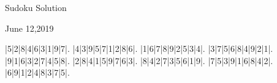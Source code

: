 \documentclass{article}
\begin{document}
\begin{center}
\Huge{Sudoku Solution}
\end{center}
\begin{center}
\Large{June 12,2019}
\end{center}
\begin{sudoku}
|5|2|8|4|6|3|1|9|7|.
|4|3|9|5|7|1|2|8|6|.
|1|6|7|8|9|2|5|3|4|.
|3|7|5|6|8|4|9|2|1|.
|9|1|6|3|2|7|4|5|8|.
|2|8|4|1|5|9|7|6|3|.
|8|4|2|7|3|5|6|1|9|.
|7|5|3|9|1|6|8|4|2|.
|6|9|1|2|4|8|3|7|5|.
\end{sudoku}
\end{document}
